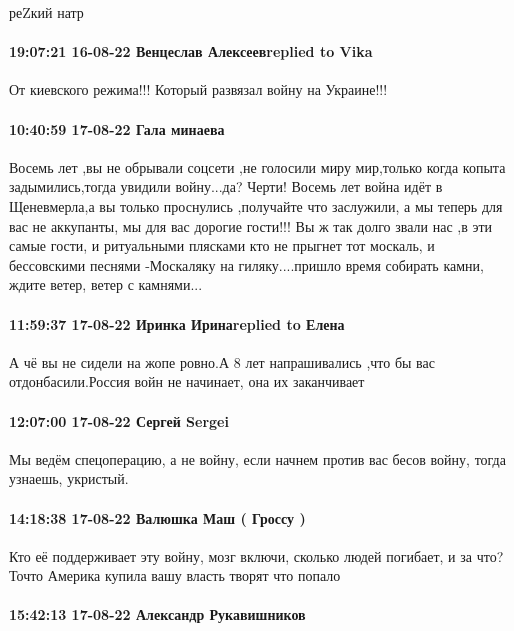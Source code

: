 реZкий натр

\paragraph{19:07:21 16-08-22 Венцеслав Алексеевreplied to Vika}

От киевского режима!!! Который развязал войну на Украине!!!

\paragraph{10:40:59 17-08-22 Гала минаева}

Восемь лет ,вы не обрывали соцсети ,не голосили миру мир,только когда копыта
задымились,тогда увидили войну...да? Черти! Восемь лет война идёт в
Щеневмерла,а вы только проснулись ,получайте что заслужили, а мы теперь для вас
не аккупанты, мы для вас дорогие гости!!! Вы ж так долго звали нас ,в эти самые
гости, и ритуальными плясками кто не прыгнет тот москаль, и бессовскими песнями
-Москаляку на гиляку....пришло время собирать камни, ждите ветер, ветер с
камнями...

\paragraph{11:59:37 17-08-22 Иринка Иринаreplied to Елена}

А чё вы не сидели на жопе ровно.А 8 лет напрашивались ,что бы вас
отдонбасили.Россия войн не начинает, она их заканчивает

\paragraph{12:07:00 17-08-22 Сергей Sergei}

Мы ведём спецоперацию, а не войну, если начнем против вас бесов войну, тогда
узнаешь, укристый.

\paragraph{14:18:38 17-08-22 Валюшка Маш ( Гроссу )}

Кто её поддерживает эту войну, мозг включи, сколько людей погибает, и за что?
Точто Америка купила вашу власть творят что попало

\paragraph{15:42:13 17-08-22 Александр Рукавишников}

